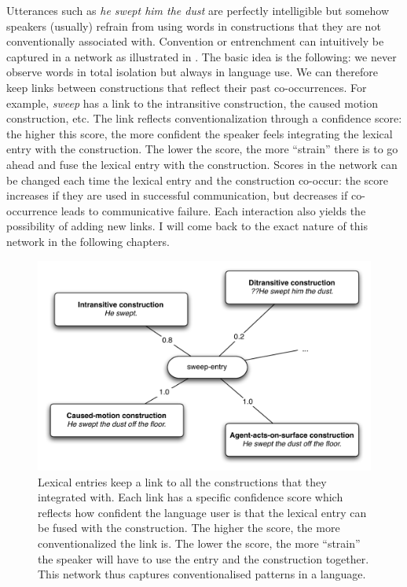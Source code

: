 Utterances such as {\em *he swept him the dust} are perfectly intelligible but somehow speakers (usually) refrain from using words in constructions that they are not conventionally associated with. Convention or entrenchment can intuitively be captured in a network as illustrated in . The basic idea is the following: we never observe words in total isolation but always in language use. We can therefore keep links between constructions that reflect their past co-occurrences. For example, {\em sweep} has a link to the intransitive construction, the caused motion construction, etc. The link reflects conventionalization through a confidence score: the higher this score, the more confident the speaker feels integrating the lexical entry with the construction. The lower the score, the more ``strain'' there is to go ahead and fuse the lexical entry with the construction. Scores in the network can be changed each time the lexical entry and the construction co-occur: the score increases if they are used in successful communication, but decreases if co-occurrence leads to communicative failure. Each interaction also yields the possibility of adding new links. I will come back to the exact nature of this network in the following chapters.

\begin{figure}[tb]
\centerline{\includegraphics[width=\linewidth]{Chapter2/figs/network}}
 \caption[Network for {\em sweep}]{Lexical entries keep a link to all the constructions that they integrated with. Each link has a specific confidence score which reflects how confident the language user is that the lexical entry can be fused with the construction. The higher the score, the more conventionalized the link is. The lower the score, the more ``strain'' the speaker will have to use the entry and the construction together. This network thus captures conventionalised patterns in a language.}
   \label{f:network-sweep}
\end{figure}

